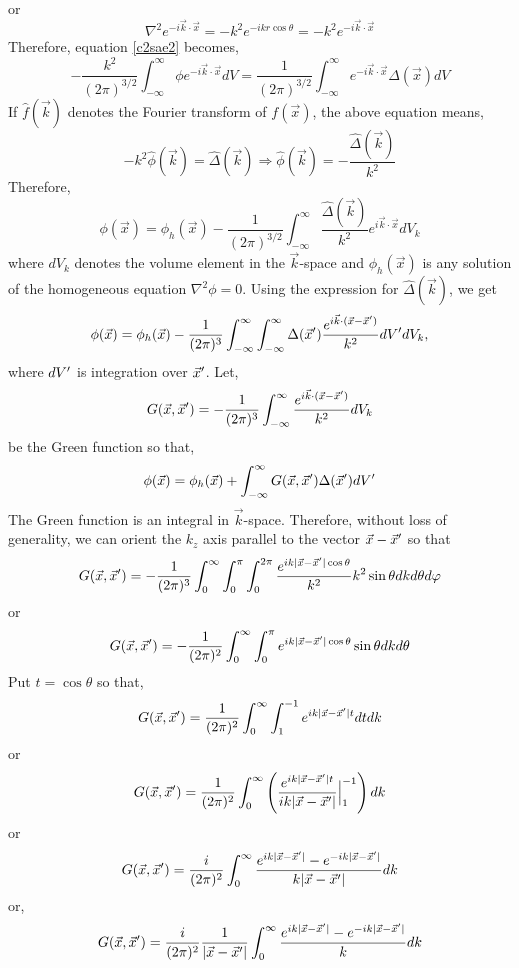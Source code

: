 or
\[
\nabla^2e^{-i\vec{k}\cdot\vec{x}} = -k^2e^{-ikr\cos\theta} = -k^2e^{-i\vec{k}\cdot\vec{x}}
\]
Therefore, equation \eqref{c2sae2} becomes,
\[
-\frac{k^2}{(2\pi)^{3/2}}\int_{-\infty}^{\infty} \phi e^{-i\vec{k}\cdot\vec{x}} dV = \frac{1}{(2\pi)^{3/2}}\int_{-\infty}^{\infty} e^{-i\vec{k}\cdot\vec{x}}\Delta(\vec{x}) dV 
\]
If $\hat{f}(\vec{k})$ denotes the Fourier transform of $f(\vec{x})$, the above equation means,
\[
-k^2\hat{\phi}(\vec{k}) = \hat{\Delta}(\vec{k}) \Rightarrow \hat{\phi}(\vec{k}) = -\frac{\hat{\Delta}(\vec{k})}{k^2}
\]
Therefore,
\[
\phi(\vec{x}) = \phi_h(\vec{x}) - \frac{1}{(2\pi)^{3/2}}\int_{-\infty}^{\infty} \frac{\hat{\Delta}(\vec{k})}{k^2} e^{i\vec{k}\cdot\vec{x}} dV_k
\]
where $dV_k$ denotes the volume element in the $\vec{k}$-space and $\phi_h(\vec{x})$ is any solution of the homogeneous equation $\nabla^2\phi = 0$. Using the expression for 
$\hat{\Delta}(\vec{k})$, we get
\[
\phi(\vec{x})=\phi_h(\vec{x})-\frac{1}{(2\pi)^{3}}\int_{-\infty}^{\infty}\int_{-\infty}^{\infty} \Delta(\vec{x}^\prime)\frac{e^{i\vec{k}\cdot(\vec{x}-\vec{x}^\prime)}}{k^2}dV^\prime dV_k,
\]
where $dV^\prime$ is integration over $\vec{x}^\prime$. Let,
\[
G(\vec{x}, \vec{x}^\prime) = -\frac{1}{(2\pi)^{3}}\int_{-\infty}^{\infty}\frac{e^{i\vec{k}\cdot(\vec{x}-\vec{x}^\prime)}}{k^2}dV_k
\]
be the Green function so that,
\begin{equation}\label{c2sae3}
\phi(\vec{x})=\phi_h(\vec{x}) + \int_{-\infty}^{\infty}G(\vec{x}, \vec{x}^\prime)\Delta(\vec{x}^\prime) dV^\prime
\end{equation}
The Green function is an integral in $\vec{k}$-space. Therefore, without loss of generality, we can orient the $k_z$ axis parallel 
to the vector $\vec{x}-\vec{x}^\prime$ so that
\[
G(\vec{x}, \vec{x}^\prime) = -\frac{1}{(2\pi)^{3}}\int_{0}^{\infty}\int_0^\pi\int_0^{2\pi}\frac{e^{ik|\vec{x}-\vec{x}^\prime|\cos\theta}}{k^2}k^2\sin\theta dk d\theta d\varphi
\]
or
\[
G(\vec{x}, \vec{x}^\prime) = -\frac{1}{(2\pi)^{2}}\int_{0}^{\infty}\int_0^\pi e^{ik|\vec{x}-\vec{x}^\prime|\cos\theta}\sin\theta dk d\theta
\]
Put $t = \cos\theta$ so that,
\[
G(\vec{x}, \vec{x}^\prime) = \frac{1}{(2\pi)^{2}}\int_{0}^{\infty}\int_1^{-1} e^{ik|\vec{x}-\vec{x}^\prime| t} dt dk
\]
or
\[
G(\vec{x}, \vec{x}^\prime) = \frac{1}{(2\pi)^{2}}\int_{0}^{\infty}\left( \frac{e^{ik|\vec{x}-\vec{x}^\prime| t}}{ik|\vec{x}-\vec{x}^\prime|}\Big|_{1}^{-1}\right)dk
\]
or
\[
G(\vec{x}, \vec{x}^\prime) = \frac{i}{(2\pi)^{2}}\int_{0}^{\infty} \frac{e^{ik|\vec{x}-\vec{x}^\prime|} - e^{-ik|\vec{x}-\vec{x}^\prime|}}{k|\vec{x}-\vec{x}^\prime|} dk
\]
or,
\[
G(\vec{x}, \vec{x}^\prime) = \frac{i}{(2\pi)^{2}}\frac{1}{|\vec{x}-\vec{x}^\prime|}\int_{0}^{\infty} \frac{e^{ik|\vec{x}-\vec{x}^\prime|} - e^{-ik|\vec{x}-\vec{x}^\prime|}}{k} dk
\]
